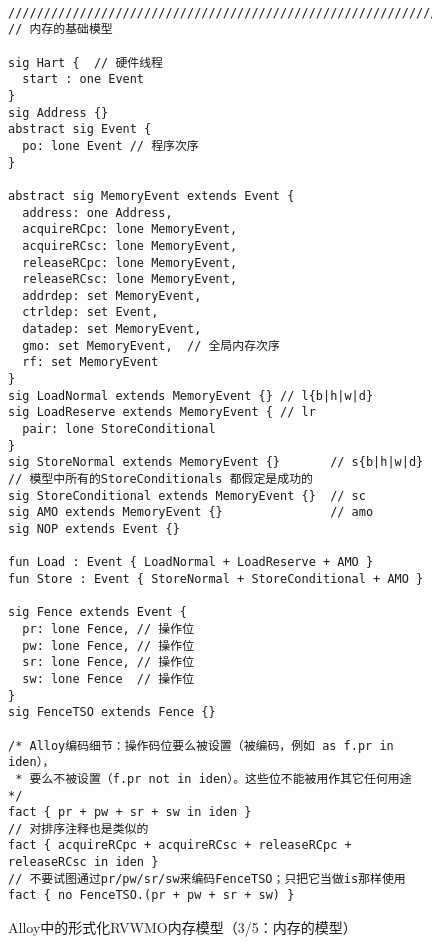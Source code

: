 \begin{figure}[h!]
  {
  \tt\bfseries\centering\footnotesize
  \begin{lstlisting}
////////////////////////////////////////////////////////////////////////////////
// 内存的基础模型

sig Hart {  // 硬件线程
  start : one Event
}
sig Address {}
abstract sig Event {
  po: lone Event // 程序次序
}

abstract sig MemoryEvent extends Event {
  address: one Address,
  acquireRCpc: lone MemoryEvent,
  acquireRCsc: lone MemoryEvent,
  releaseRCpc: lone MemoryEvent,
  releaseRCsc: lone MemoryEvent,
  addrdep: set MemoryEvent,
  ctrldep: set Event,
  datadep: set MemoryEvent,
  gmo: set MemoryEvent,  // 全局内存次序
  rf: set MemoryEvent
}
sig LoadNormal extends MemoryEvent {} // l{b|h|w|d}
sig LoadReserve extends MemoryEvent { // lr
  pair: lone StoreConditional
}
sig StoreNormal extends MemoryEvent {}       // s{b|h|w|d}
// 模型中所有的StoreConditionals 都假定是成功的
sig StoreConditional extends MemoryEvent {}  // sc
sig AMO extends MemoryEvent {}               // amo
sig NOP extends Event {}

fun Load : Event { LoadNormal + LoadReserve + AMO }
fun Store : Event { StoreNormal + StoreConditional + AMO }

sig Fence extends Event {
  pr: lone Fence, // 操作位
  pw: lone Fence, // 操作位
  sr: lone Fence, // 操作位
  sw: lone Fence  // 操作位
}
sig FenceTSO extends Fence {}

/* Alloy编码细节：操作码位要么被设置（被编码，例如 as f.pr in iden），
 * 要么不被设置（f.pr not in iden）。这些位不能被用作其它任何用途 */
fact { pr + pw + sr + sw in iden }
// 对排序注释也是类似的
fact { acquireRCpc + acquireRCsc + releaseRCpc + releaseRCsc in iden }
// 不要试图通过pr/pw/sr/sw来编码FenceTSO；只把它当做is那样使用
fact { no FenceTSO.(pr + pw + sr + sw) }
\end{lstlisting}}
  \caption{Alloy中的形式化RVWMO内存模型（3/5：内存的模型）}
  \label{fig:alloy3}
\end{figure}


